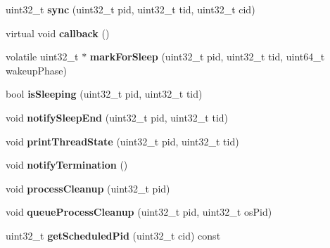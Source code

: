 \begin{DoxyCompactItemize}
\item 
\hypertarget{classScheduler_ac44185577c19d4afc2d592696550a7d8}{uint32\-\_\-t {\bfseries sync} (uint32\-\_\-t pid, uint32\-\_\-t tid, uint32\-\_\-t cid)}\label{classScheduler_ac44185577c19d4afc2d592696550a7d8}

\item 
\hypertarget{classScheduler_abdfd882aca8d4d3cdbe7cc2c0161a1ff}{virtual void {\bfseries callback} ()}\label{classScheduler_abdfd882aca8d4d3cdbe7cc2c0161a1ff}

\item 
\hypertarget{classScheduler_a8140a51d4ef2b55bc29b819f28f76b5e}{volatile uint32\-\_\-t $\ast$ {\bfseries mark\-For\-Sleep} (uint32\-\_\-t pid, uint32\-\_\-t tid, uint64\-\_\-t wakeup\-Phase)}\label{classScheduler_a8140a51d4ef2b55bc29b819f28f76b5e}

\item 
\hypertarget{classScheduler_a59ed4da4a484b2a736e06f32f62b6110}{bool {\bfseries is\-Sleeping} (uint32\-\_\-t pid, uint32\-\_\-t tid)}\label{classScheduler_a59ed4da4a484b2a736e06f32f62b6110}

\item 
\hypertarget{classScheduler_a9b2f33234735461120ecfd51d43bf107}{void {\bfseries notify\-Sleep\-End} (uint32\-\_\-t pid, uint32\-\_\-t tid)}\label{classScheduler_a9b2f33234735461120ecfd51d43bf107}

\item 
\hypertarget{classScheduler_a923741f4201a1c333fc2330f9f47a946}{void {\bfseries print\-Thread\-State} (uint32\-\_\-t pid, uint32\-\_\-t tid)}\label{classScheduler_a923741f4201a1c333fc2330f9f47a946}

\item 
\hypertarget{classScheduler_aa2e98eac3b53295634ae8205415dfbc9}{void {\bfseries notify\-Termination} ()}\label{classScheduler_aa2e98eac3b53295634ae8205415dfbc9}

\item 
\hypertarget{classScheduler_ad640338d9b2dabbce9a8cffd3d7646f6}{void {\bfseries process\-Cleanup} (uint32\-\_\-t pid)}\label{classScheduler_ad640338d9b2dabbce9a8cffd3d7646f6}

\item 
\hypertarget{classScheduler_af66820699b9a767d829e8e0972d9ae12}{void {\bfseries queue\-Process\-Cleanup} (uint32\-\_\-t pid, uint32\-\_\-t os\-Pid)}\label{classScheduler_af66820699b9a767d829e8e0972d9ae12}

\item 
\hypertarget{classScheduler_a03e71af59d59d45c7e0634f1755bbf53}{uint32\-\_\-t {\bfseries get\-Scheduled\-Pid} (uint32\-\_\-t cid) const }\label{classScheduler_a03e71af59d59d45c7e0634f1755bbf53}


\end{DoxyCompactItemize}
